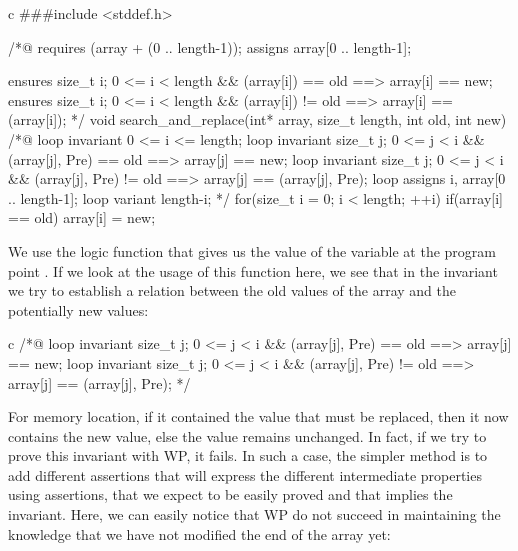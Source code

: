 \documentclass[middle]{zmdocument}
\begin{document}
\begin{CodeBlock}{c}
###include <stddef.h>

/*@
  requires \valid(array + (0 .. length-1));
  assigns array[0 .. length-1];

  ensures \forall size_t i; 0 <= i < length && \old(array[i]) == old
             ==> array[i] == new;
  ensures \forall size_t i; 0 <= i < length && \old(array[i]) != old 
             ==> array[i] == \old(array[i]);
*/
void search_and_replace(int* array, size_t length, int old, int new){
  /*@
    loop invariant 0 <= i <= length;
    loop invariant \forall size_t j; 0 <= j < i && \at(array[j], Pre) == old 
                     ==> array[j] == new;
    loop invariant \forall size_t j; 0 <= j < i && \at(array[j], Pre) != old 
                     ==> array[j] == \at(array[j], Pre);
    loop assigns i, array[0 .. length-1];
    loop variant length-i;
  */
  for(size_t i = 0; i < length; ++i){
    if(array[i] == old) array[i] = new;
  }
}
\end{CodeBlock}



We use the logic function  that gives us the
value of the variable  at the program point .
If we look at the usage of this function here, we see that in the
invariant we try to establish a relation between the old values of the
array and the potentially new values:



\begin{CodeBlock}{c}
/*@
  loop invariant \forall size_t j; 0 <= j < i && \at(array[j], Pre) == old 
                   ==> array[j] == new;
  loop invariant \forall size_t j; 0 <= j < i && \at(array[j], Pre) != old 
                   ==> array[j] == \at(array[j], Pre);
*/
\end{CodeBlock}



For memory location, if it contained the value that must be replaced,
then it now contains the new value, else the value remains unchanged. In
fact, if we try to prove this invariant with WP, it fails. In such a
case, the simpler method is to add different assertions that will
express the different intermediate properties using assertions, that we
expect to be easily proved and that implies the invariant. Here, we can
easily notice that WP do not succeed in maintaining the knowledge that
we have not modified the end of the array yet:
\end{document}
